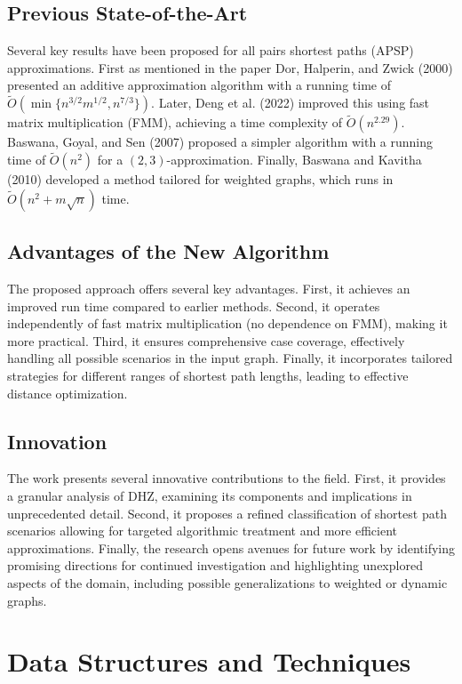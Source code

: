 \documentclass[a4paper,11pt,oneside]{book}
\begin{document}
\subsection*{Previous State-of-the-Art}
Several key results have been proposed for all pairs shortest paths (APSP) approximations. First as mentioned in the paper Dor, Halperin, and Zwick (2000) presented an additive approximation algorithm with a running time of $\tilde{O}(\min\{n^{3/2}m^{1/2}, n^{7/3}\})$. Later, Deng et al. (2022) improved this using fast matrix multiplication (FMM), achieving a time complexity of $\tilde{O}(n^{2.29})$. Baswana, Goyal, and Sen (2007) proposed a simpler algorithm with a running time of $\tilde{O}(n^2)$ for a $(2,3)$-approximation. Finally, Baswana and Kavitha (2010) developed a method tailored for weighted graphs, which runs in $\tilde{O}(n^2 + m\sqrt{n})$ time.


\subsection*{Advantages of the New Algorithm}
The proposed approach offers several key advantages. First, it achieves an improved run time compared to earlier methods. Second, it operates independently of fast matrix multiplication (no dependence on FMM), making it more practical. Third, it ensures comprehensive case coverage, effectively handling all possible scenarios in the input graph. Finally, it incorporates tailored strategies for different ranges of shortest path lengths, leading to effective distance optimization.


\subsection*{Innovation}
The work presents several innovative contributions to the field. First, it provides a granular analysis of DHZ, examining its components and implications in unprecedented detail. Second, it proposes a refined classification of shortest path scenarios allowing for targeted algorithmic treatment and more efficient approximations. Finally, the research opens avenues for future work by identifying promising directions for continued investigation and highlighting unexplored aspects of the domain, including possible generalizations to weighted or dynamic graphs.


\section*{Data Structures and Techniques}
\end{document}
